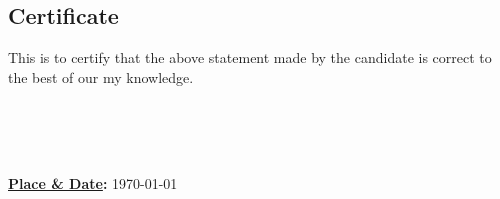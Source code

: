 \begin{minipage}{\textwidth}
    \begin{flushleft}
        {\let\clearpage\relax\chapter*{\centering Certificate}}

        This is to certify that the above statement made by the candidate is correct to the best of 
        \ifdefined\multipleadvisors our \else my \fi 
        knowledge.

        \vspace{0.4in}

        \begin{minipage}{0.45\textwidth}
            \begin{flushleft}
                
            
                \textbf{\advisorone}
                \textbf{
                    \ifx\advisortwo\empty\else      \\\advisortwo\fi 
                    \ifx\advisorthree\empty\else    \\\advisorthree\fi 
                    \ifx\advisorfour\empty\else     \\\advisorfour\fi   
                }
            \end{flushleft}
            
        \end{minipage}%
        \hfill
        \begin{minipage}{0.45\textwidth}
            \textbf{\underline{Place \& Date}:} \today
        \end{minipage}%
    \end{flushleft}
\end{minipage}